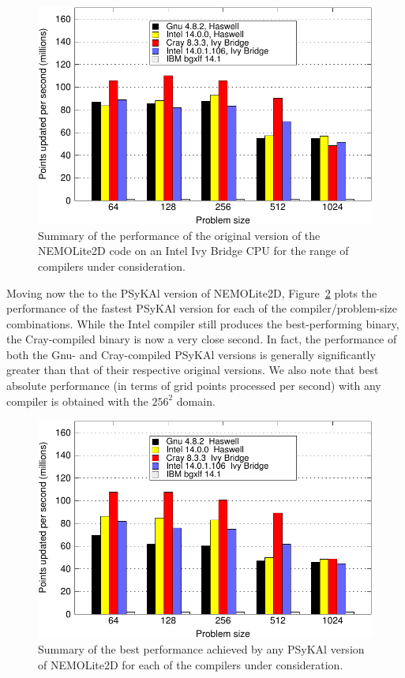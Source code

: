 \documentclass[gmd, manuscript]{copernicus}
\newlength{\picwidth}
\begin{document}
\begin{figure}[!t]
\centering
\includegraphics[width=\picwidth]{orig_summary}
\caption{Summary of the performance of the original version of the 
NEMOLite2D code on an Intel Ivy Bridge CPU for
the range of compilers under consideration.}
\label{FIG_orig_perf_summary}
\end{figure}

Moving now the to the {PS}y{KA}l version of NEMOLite2D,
Figure~\ref{FIG_best_psykal_perf_summary} plots the performance of the
fastest {PS}y{KA}l version for each of the compiler/problem-size combinations.
While the Intel compiler still produces the best-performing binary,
the Cray-compiled binary is now a very close second. In fact, the
performance of both the Gnu- and Cray-compiled {PS}y{KA}l versions is
generally significantly greater than that of their respective original
versions. We also note that best absolute performance (in terms of
grid points processed per second) with any compiler is obtained with
the $256^2$ domain.

\begin{figure}[!t]
\centering
\includegraphics[width=\picwidth]{best_psykal_summary}
\caption{Summary of the best performance achieved by any {PS}y{KA}l 
version of NEMOLite2D for each of the compilers under consideration.}
\label{FIG_best_psykal_perf_summary}
\end{figure}
\end{document}
